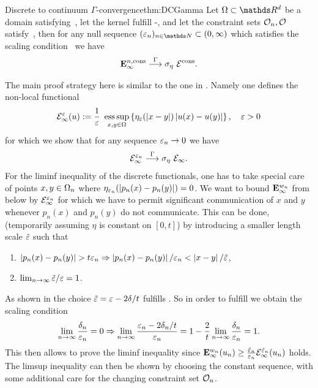 \begin{theorem}{Discrete to continuum $\Gamma$-convergence}{thm:DCGamma}
Let $\domain\subset\R^d$ be a domain satisfying~, let the kernel fulfill -, and let the constraint sets $\mathcal{O}_n,\mathcal{O}$ satisfy~, then for any null sequence $(\gscale_n)_{n\in\N}\subset(0,\infty)$ which satisfies the scaling condition~
we have
\begin{align}
\mathbf{E}^{n,\mathrm{cons}}_\infty \overset{\Gamma}{\longrightarrow} \sigma_{\eta}~\mathcal{E}^\mathrm{cons}.
\end{align}
\end{theorem}
%
The main proof strategy here is similar to the one in \cite{GarcSlep15, slepcev2019analysis}. Namely one defines the non-local functional
%
\begin{align*}
\mathcal{E}^{\varepsilon}_\infty(u) := \frac{1}{\varepsilon}~\operatorname*{ess\,sup}_{x,y\in\Omega}
\left\{
\eta_{\varepsilon}(\left|x-y\right|)\left|u(x) - u(y)\right|
\right\},\quad\varepsilon>0
\end{align*}
%
for which we show that for any sequence $\varepsilon_n\to 0$ we have \cite[Thm. 4]{roith2022continuum}
\begin{align*}
\mathcal{E}^{\varepsilon_n}_\infty\overset{\Gamma}{\longrightarrow} \sigma_{\eta}~\mathcal{E}_\infty.
\end{align*}
%
For the liminf inequality of the discrete functionals, one has to take special care of points $x,y\in\Omega_n$ where $\eta_{\varepsilon_n}(\left|p_n(x) - p_n(y)\right|)=0$. We want to bound $\mathbf{E}^{w_n}_\infty$ from below by $\mathcal{E}_\infty^{\varepsilon_n}$ for which we have to permit significant communication of $x$ and $y$ whenever $p_n(x)$  and $p_n(y)$ do not communicate. This can be done, (temporarily assuming $\eta$ is constant on $[0,t]$) by introducing a smaller length scale $\tilde{\varepsilon}$ such that
%
\begin{enumerate}[label=(\roman*)]
\item\label{ga} $\left|p_n(x) - p_n(y)\right| > t\varepsilon_n\Rightarrow \left|p_n(x) - p_n(y)\right|/\varepsilon_n < \left|x-y\right|/\tilde{\varepsilon}$,
\item\label{gb} $\lim_{n\to\infty} \tilde{\varepsilon}/\varepsilon=1$.
\end{enumerate}
%
As shown in \cite{roith2022continuum} the choice $\tilde{\varepsilon}= \varepsilon - 2 \delta/t$ fulfills . So in order to fulfill 
 we obtain the scaling condition
%
\begin{align*}
\lim_{n\to\infty} \frac{\delta_n}{\varepsilon_n} = 0\Rightarrow \lim_{n\to\infty} \frac{\varepsilon_n - 2 \delta_n/t}{\varepsilon_n} = 1 - \frac{2}{t} \lim_{n\to\infty} \frac{\delta_n}{\varepsilon_n} = 1.
\end{align*}
%
This then allows to prove the liminf inequality since $\mathbf{E}^{w_n}_\infty(u_n)\geq \frac{\tilde{\varepsilon}_n}{\varepsilon_n} \mathcal{E}^{\tilde{\varepsilon}_n}_\infty(u_n)$ holds. The limsup inequality can then be shown by choosing the constant sequence, with some additional care for the changing constraint set $\mathcal{O}_n$.
%
%
